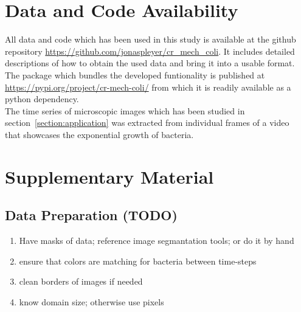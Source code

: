 \documentclass{article}
\begin{document}
\section{Data and Code Availability}
\label{section:data-code-availability}
All data and code which has been used in this study is available at the github repository
\url{https://github.com/jonaspleyer/cr\_mech\_coli}.
It includes detailed descriptions of how to obtain the used data and bring it into a usable format.
The package which bundles the developed funtionality is published at
\url{https://pypi.org/project/cr-mech-coli/} from which it is readily available as a python
dependency.\\
The time series of microscopic images which has been studied in section~\ref{section:application}
was extracted from individual frames of a video~\cite{https://doi.org/10.3203/iwf/k-129} that
showcases the exponential growth of bacteria.




\appendix
\renewcommand{\thesection}{}
\renewcommand{\thesubsection}{S\arabic{subsection}}
\section{Supplementary Material}

\subsection{Data Preparation (TODO)}
\begin{enumerate}
    \item Have masks of data; reference image segmantation tools; or do it by hand
    \item ensure that colors are matching for bacteria between time-steps
    \item clean borders of images if needed
    \item know domain size; otherwise use pixels
\end{enumerate}

\end{document}
